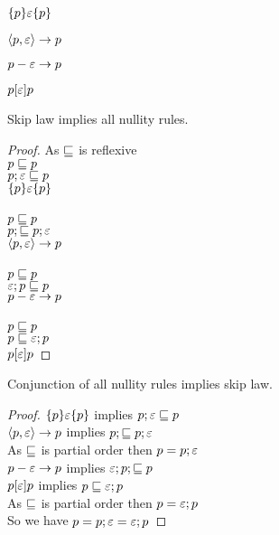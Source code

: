 \documentclass{article}
\begin{document}
\begin{rul}
$\{p\} \varepsilon \{p\}$
\end{rul}

\begin{rul}
$\left< p, \varepsilon \right> \rightarrow p$
\end{rul}

\begin{rul}
$p-\varepsilon\rightarrow p$
\end{rul}

\begin{rul}
$p [\varepsilon] p$
\end{rul}

\begin{theorem}
Skip law implies all nullity rules.
\end{theorem}

\begin{proof}
As $\sqsubseteq$ is reflexive\\
$p \sqsubseteq p$\\
$p; \varepsilon \sqsubseteq p$\\
$\{p\} \varepsilon \{p\}$\\
\\
$p \sqsubseteq p$\\
$p; \sqsubseteq p; \varepsilon$\\
$\left< p, \varepsilon \right> \rightarrow p$\\
\\
$p \sqsubseteq p$\\
$\varepsilon; p \sqsubseteq p$\\
$p-\varepsilon\rightarrow p$\\
\\
$p \sqsubseteq p$\\
$p \sqsubseteq \varepsilon; p$\\
$p [\varepsilon] p$
\end{proof}

\begin{theorem}
Conjunction of all nullity rules implies skip law.
\end{theorem}

\begin{proof}
$\{p\} \varepsilon \{p\}$ implies $p; \varepsilon \sqsubseteq p$\\
$\left< p, \varepsilon \right> \rightarrow p$ implies $p; \sqsubseteq p; \varepsilon$\\
As $\sqsubseteq$ is partial order then $p = p; \varepsilon$\\
$p-\varepsilon\rightarrow p$ implies $\varepsilon; p; \sqsubseteq p$\\
$p [\varepsilon] p$ implies $p \sqsubseteq \varepsilon; p$\\
As $\sqsubseteq$ is partial order then $p = \varepsilon; p$\\
So we have $p = p; \varepsilon = \varepsilon; p$
\end{proof}
\end{document}
